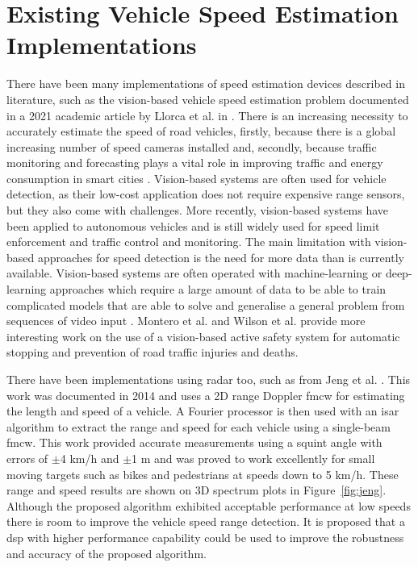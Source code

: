 \documentclass[class=report,11pt,crop=false]{standalone}
\begin{document}
\section{Existing Vehicle Speed Estimation Implementations}
There have been many implementations of speed estimation devices described in literature, such as the vision-based vehicle speed estimation problem documented in a 2021 academic article by Llorca et al. in \cite{llorca}. There is an increasing necessity to accurately estimate the speed of road vehicles, firstly, because there is a global increasing number of speed cameras installed and, secondly, because traffic monitoring and forecasting plays a vital role in improving traffic and energy consumption in smart cities \cite{llorca}. Vision-based systems are often used for vehicle detection, as their low-cost application does not require expensive range sensors, but they also come with challenges. More recently, vision-based systems have been applied to autonomous vehicles and is still widely used for speed limit enforcement and traffic control and monitoring. The main limitation with vision-based approaches for speed detection is the need for more data than is currently available. Vision-based systems are often operated with machine-learning or deep-learning approaches which require a large amount of data to be able to train complicated models that are able to solve and generalise a general problem from sequences of video input \cite{llorca, montero, wilson}. Montero et al. \cite{motero} and Wilson et al. \cite{wilson} provide more interesting work on the use of a vision-based active safety system for automatic stopping and prevention of road traffic injuries and deaths.

There have been implementations using radar too, such as from Jeng et al. \cite{jeng}. This work was documented in 2014 and uses a 2D range Doppler \gls{fmcw} for estimating the length and speed of a vehicle. A Fourier processor is then used with an \gls{isar} algorithm to extract the range and speed for each vehicle using a single-beam \gls{fmcw}. This work provided accurate measurements using a squint angle with errors of $\pm$4 km/h and $\pm$1 m and was proved to work excellently for small moving targets such as bikes and pedestrians at speeds down to 5 km/h. These range and speed results are shown on 3D spectrum plots in Figure~\ref{fig:jeng}. Although the proposed algorithm exhibited acceptable performance at low speeds there is room to improve the vehicle speed range detection. It is proposed that a \gls{dsp} with higher performance capability could be used to improve the robustness and accuracy of the proposed algorithm.
\end{document}
